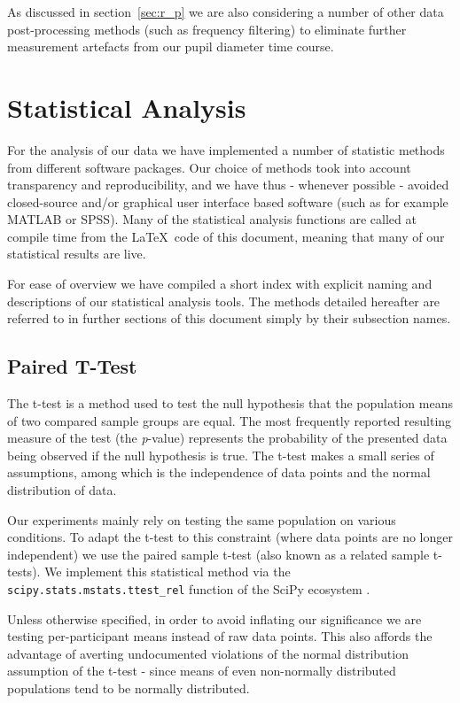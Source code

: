 	    As discussed in section~\ref{sec:r_p} we are also considering a number of other data post-processing methods (such as frequency filtering) to eliminate further measurement artefacts from our pupil diameter time course. 
    \section{Statistical Analysis}\label{sec:m_sa}
	For the analysis of our data we have implemented a number of statistic methods from different software packages.
	Our choice of methods took into account transparency and reproducibility, and we have thus - whenever possible - avoided closed-source and/or graphical user interface based software (such as for example MATLAB\textsuperscript{\small\textregistered} or SPSS\textsuperscript{\small\textregistered}).
	Many of the statistical analysis functions are called at compile time from the \LaTeX\ code of this document, meaning that many of our statistical results are live.
	
	For ease of overview we have compiled a short index with explicit naming and descriptions of our statistical analysis tools.
	The methods detailed hereafter are referred to in further sections of this document simply by their subsection names.
	\subsection{Paired T-Test}\label{sec:m_sa_pt}
	    The t-test is a method used to test the null hypothesis that the population means of two compared sample groups are equal.
	    The most frequently reported resulting measure of the test (the \textit{p}-value) represents the probability of the presented data being observed if the null hypothesis is true. 
	    The t-test makes a small series of assumptions, among which is the independence of data points and the normal distribution of data.
	    
	    Our experiments mainly rely on testing the same population on various conditions.
	    To adapt the t-test to this constraint (where data points are no longer independent) we use the paired sample t-test (also known as a related sample t-tests).
	    We implement this statistical method via the \colorbox{vlg}{\texttt{scipy.stats.mstats.ttest\_rel}} function of the SciPy ecosystem \citep{scipy,Oliphant2007}.
	    
	    Unless otherwise specified, in order to avoid inflating our significance we are testing per-participant means instead of raw data points.
	    This also affords the advantage of averting undocumented violations of the normal distribution assumption of the t-test -
	    since means of even non-normally distributed populations tend to be normally distributed.  

